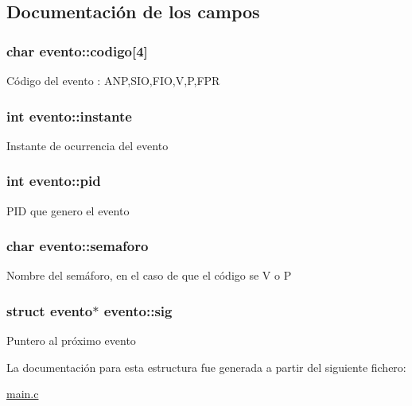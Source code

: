 \subsection{Documentación de los campos}
\hypertarget{structevento_a3cccf0303093589ffa836df8f368bdef}{
\subsubsection[{codigo}]{\setlength{\rightskip}{0pt plus 5cm}char evento\-::codigo\mbox{[}4\mbox{]}}}\label{structevento_a3cccf0303093589ffa836df8f368bdef}
Código del evento \-: A\-N\-P,S\-I\-O,F\-I\-O,V,P,F\-P\-R \hypertarget{structevento_a8fbfa37705af883fec99b428586416b6}{
\subsubsection[{instante}]{\setlength{\rightskip}{0pt plus 5cm}int evento\-::instante}}\label{structevento_a8fbfa37705af883fec99b428586416b6}
Instante de ocurrencia del evento \hypertarget{structevento_ac3b0a8c87cce053e4200e7135398b9bb}{
\subsubsection[{pid}]{\setlength{\rightskip}{0pt plus 5cm}int evento\-::pid}}\label{structevento_ac3b0a8c87cce053e4200e7135398b9bb}
P\-I\-D que genero el evento \hypertarget{structevento_a7da79f66e192bd5ce943d984d676e126}{
\subsubsection[{semaforo}]{\setlength{\rightskip}{0pt plus 5cm}char evento\-::semaforo}}\label{structevento_a7da79f66e192bd5ce943d984d676e126}
Nombre del semáforo, en el caso de que el código se V o P \hypertarget{structevento_a2575b8410e413713cad01644e2ae6565}{
\subsubsection[{sig}]{\setlength{\rightskip}{0pt plus 5cm}struct {\bf evento}$\ast$ evento\-::sig}}\label{structevento_a2575b8410e413713cad01644e2ae6565}
Puntero al próximo evento 

La documentación para esta estructura fue generada a partir del siguiente fichero\-:\begin{DoxyCompactItemize}
\item 
\hyperlink{main_8c}{main.\-c}\end{DoxyCompactItemize}
